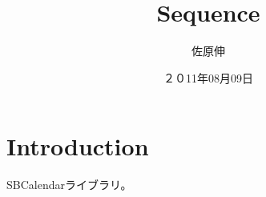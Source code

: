\documentclass[\pformat,12pt]{jarticle}
\title{Sequence}
\author{佐原伸}
\date{２０11年08月09日}
\begin{document}
\maketitle

\section{Introduction}

SBCalendarライブラリ。

	

	


\newpage
{}
\printindex
\end{document}
